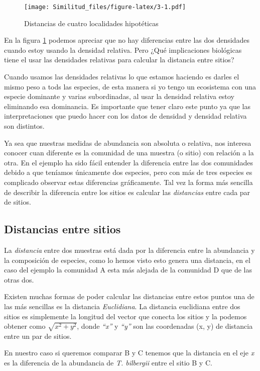 \documentclass[]{book}
\begin{document}
\begin{figure}[htbp]
\centering
\texttt{[image: Similitud\_files/figure-latex/3-1.pdf]}
\caption{\label{fig:3}Distancias de cuatro localidades hipotéticas}
\end{figure}

En la figura \ref{fig:3} podemos apreciar que no hay diferencias entre
las dos densidades cuando estoy usando la densidad relativa. Pero ¿Qué
implicaciones biológicas tiene el usar las densidades relativas para
calcular la distancia entre sitios?

Cuando usamos las densidades relativas lo que estamos haciendo es darles
el mismo peso a tods las especies, de esta manera si yo tengo un
ecosistema con una especie dominante y varias subordinadas, al usar la
densidad relativa estoy eliminando esa dominancia. Es importante que
tener claro este punto ya que las interpretaciones que puedo hacer con
los datos de densidad y densidad relativa son distintos.

Ya sea que nuestras medidas de abundancia son absoluta o relativa, nos
interesa conocer cuan diferente es la comunidad de una muestra (o sitio)
con relación a la otra. En el ejemplo ha sido fácil entender la
diferencia entre las dos comunidades debido a que teníamos únicamente
dos especies, pero con más de tres especies es complicado observar estas
diferencias gráficamente. Tal vez la forma más sencilla de describir la
diferencia entre los sitios es calcular las \emph{distancias} entre cada
par de sitios.

\subsection{Distancias entre sitios}\label{distancias-entre-sitios-1}

La \emph{distancia} entre dos muestras está dada por la diferencia entre
la abundancia y la composición de especies, como lo hemos visto esto
genera una distancia, en el caso del ejemplo la comunidad A esta más
alejada de la comunidad D que de las otras dos.

Existen muchas formas de poder calcular las distancias entre estos
puntos una de las más sencillas es la distancia \emph{Euclidiana}. La
distancia euclidiana entre dos sitios es simplemente la longitud del
vector que conecta los sitios y la podemos obtener como
\(\sqrt{x^2+y^2}\), donde \emph{``x''} y \emph{``y''} son las
coordenadas (x, y) de distancia entre un par de sitios.

En nuestro caso si queremos comparar B y C tenemos que la distancia en
el eje \emph{x} es la diferencia de la abundancia de \emph{T. bilbergii}
entre el sitio B y C.
\end{document}
